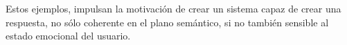 \documentclass[11pt,a4paper,spanish]{book}
\begin{document}
	Estos ejemplos, impulsan la motivación de crear un sistema capaz de crear una respuesta, no sólo coherente en el plano semántico, si no también sensible al estado emocional del usuario.
	
 \begin{comment}
 Affective computing opens a new area of research in computer science with the aim to improve the way how humans and machines interact. Recognition of human emotions by machines is becoming a significant focus in recent research in different disciplines related to information sciences and Human-Computer Interaction (HCI)
 Humans verbally communicate by speech and
 language. This enables faster sharing of messages, conveying of ideas and spreading of inventions. Communication between humans is actually not just what humans say, but also how they say it. Furthermore, facial expressions, as a part of non-verbal communication, are responsible for about 55%
 S.Lugovic
 \end{comment}
\end{document}
